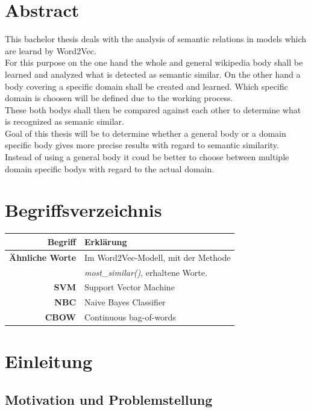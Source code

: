 \documentclass[12pt,a4paper]{report}
\begin{document}
\chapter*{Abstract}
This bachelor thesis deals with the analysis of semantic relations in models which are learnd by Word2Vec.\\
For this purpose on the one hand the whole and general wikipedia body shall be learned and analyzed what is detected as semantic similar. On the other hand a body covering a specific domain shall be created and learned. Which specific domain is choosen will be defined due to the working process.\\
These both bodys shall then be compared against each other to determine what is recognized as semanic similar.\\
Goal of this thesis will be to determine whether a general body or a domain specific body gives more precise results with regard to semantic similarity. Instead of using a general body it coud be better to choose between multiple domain specific bodys with regard to the actual domain.

\newpage
\tableofcontents
\newpage
\chapter*{Begriffsverzeichnis}
	\begin{tabular}{r|l}	
	\textbf{Begriff} & Erklärung\\
	\hline	
	\textbf{Ähnliche Worte} & Im Word2Vec-Modell, mit der Methode\\
	& \textit{most\_similar()}, erhaltene Worte.\\
	\textbf{SVM} & Support Vector Machine\\
	\textbf{NBC} & Naive Bayes Classifier\\
	\textbf{CBOW} & Continuous bag-of-words\\

\end{tabular}
\newpage
{}
\chapter{Einleitung}
	\section{Motivation und Problemstellung}
	  
\end{document}
